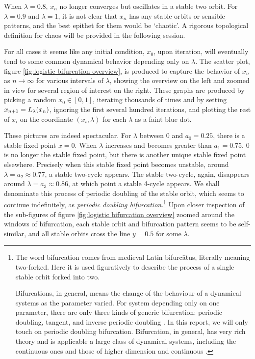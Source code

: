 When $\lambda = 0.8$, $x_n$ no longer converges but oscillates in a stable two orbit. 
For $\lambda = 0.9$ and $\lambda = 1$, it is not clear that $x_n$ has any stable orbits or sensible patterns, and the best epithet for them would be `chaotic'.
A rigorous topological definition for chaos will be provided in the following session. 

For all cases it seems like any initial condition, $x_0$, upon iteration, will eventually tend to some common dynamical behavior depending only on $\lambda$.
The scatter plot, figure \ref{fig:logistic bifurcation overview}, is produced to capture the behavior of $x_n$ as $n \rightarrow \infty$ for various intervals of $\lambda$, showing the overview on the left and zoomed in view for several region of interest on the right.
These graphs are produced by picking a random $x_0 \in [0,1]$, iterating thousands of times and by setting $x_{n+1} = L_{\lambda}(x_n)$, ignoring the first several hundred iterations, and plotting the rest of $x_i$ on the coordinate $(x_i, \lambda)$ for each $\lambda$ as a faint blue dot.

These pictures are indeed spectacular. 
For $\lambda$ between $0$ and $a_0 = 0.25$, there is a stable fixed point $x = 0$.
When $\lambda$ increases and becomes greater than $a_1 = 0.75$, $0$ is no longer the stable fixed point, but there is another unique stable fixed point elsewhere.
Precisely when this stable fixed point becomes unstable, around $\lambda = a_2 \approx 0.77$, a stable two-cycle appears.
The stable two-cycle, again, disappears around $\lambda = a_3 \approx 0.86$, at which point a stable 4-cycle appears. 
We shall denominate this process of periodic doubling of the stable orbit, which seems to continue indefinitely, as \emph{periodic doubling bifurcation}.\footnote{
	The word bifurcation comes from medieval Latin bifurcātus, literally meaning two-forked.
	Here it is used figuratively to describe the process of a single stable orbit forked into two.
	
	Bifurcations, in general, means the change of the behaviour of a dynamical systems as the parameter varied.
	For system depending only on one parameter, there are only three kinds of generic bifurcation: periodic doubling, tangent, and inverse periodic doubling \cite{Chaos_in_DS}.
	In this report, we will only touch on periodic doubling bifurcation.
	Bifurcation, in general, has very rich theory and is applicable a large class of dynamical systems, including the continuous ones and those of higher dimension and continuous  \cite{dynamical_systems_v}.
}
Upon closer inspection of the sub-figures of figure \ref{fig:logistic bifurcation overview} zoomed around the windows of bifurcation, each stable orbit and bifurcation pattern seems to be self-similar, and all stable orbits cross the line $y = 0.5$ for some $\lambda$.

